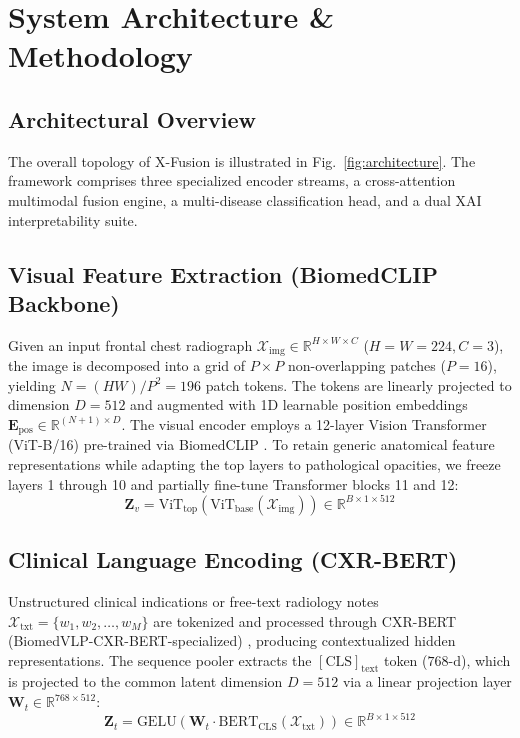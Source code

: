 \documentclass[conference]{IEEEtran}
\begin{document}
\section{System Architecture \& Methodology}
\subsection{Architectural Overview}
The overall topology of X-Fusion is illustrated in Fig.~\ref{fig:architecture}. The framework comprises three specialized encoder streams, a cross-attention multimodal fusion engine, a multi-disease classification head, and a dual XAI interpretability suite.

\subsection{Visual Feature Extraction (BiomedCLIP Backbone)}
Given an input frontal chest radiograph $\mathcal{X}_{\text{img}} \in \mathbb{R}^{H \times W \times C}$ ($H=W=224, C=3$), the image is decomposed into a grid of $P \times P$ non-overlapping patches ($P=16$), yielding $N = (HW)/P^2 = 196$ patch tokens. The tokens are linearly projected to dimension $D=512$ and augmented with 1D learnable position embeddings $\mathbf{E}_{\text{pos}} \in \mathbb{R}^{(N+1) \times D}$. The visual encoder employs a 12-layer Vision Transformer (ViT-B/16) pre-trained via BiomedCLIP \cite{zhang2023}. To retain generic anatomical feature representations while adapting the top layers to pathological opacities, we freeze layers 1 through 10 and partially fine-tune Transformer blocks 11 and 12:
\begin{equation}
\mathbf{Z}_v = \text{ViT}_{\text{top}}(\text{ViT}_{\text{base}}(\mathcal{X}_{\text{img}})) \in \mathbb{R}^{B \times 1 \times 512}
\label{eq:vision}
\end{equation}

\subsection{Clinical Language Encoding (CXR-BERT)}
Unstructured clinical indications or free-text radiology notes $\mathcal{X}_{\text{txt}} = \{w_1, w_2, \dots, w_M\}$ are tokenized and processed through CXR-BERT (BiomedVLP-CXR-BERT-specialized) \cite{boecking2022}, producing contextualized hidden representations. The sequence pooler extracts the $[\text{CLS}]_{\text{text}}$ token ($768\text{-d}$), which is projected to the common latent dimension $D=512$ via a linear projection layer $\mathbf{W}_t \in \mathbb{R}^{768 \times 512}$:
\begin{equation}
\mathbf{Z}_t = \text{GELU}(\mathbf{W}_t \cdot \text{BERT}_{\text{CLS}}(\mathcal{X}_{\text{txt}})) \in \mathbb{R}^{B \times 1 \times 512}
\label{eq:text}
\end{equation}
\end{document}
